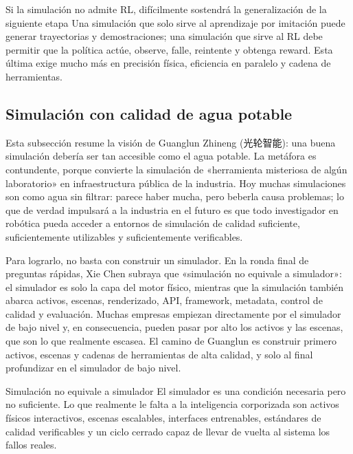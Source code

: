 \documentclass[a4paper]{article}
\begin{document}
\begin{warningbox}{Si la simulación no admite RL, difícilmente sostendrá la generalización de la siguiente etapa}
Una simulación que solo sirve al aprendizaje por imitación puede generar trayectorias y demostraciones; una simulación que sirve al RL debe permitir que la política actúe, observe, falle, reintente y obtenga reward. Esta última exige mucho más en precisión física, eficiencia en paralelo y cadena de herramientas.
\end{warningbox}

\subsection{Simulación con calidad de agua potable}

Esta subsección resume la visión de Guanglun Zhineng (光轮智能): una buena simulación debería ser tan accesible como el agua potable. La metáfora es contundente, porque convierte la simulación de «herramienta misteriosa de algún laboratorio» en infraestructura pública de la industria. Hoy muchas simulaciones son como agua sin filtrar: parece haber mucha, pero beberla causa problemas; lo que de verdad impulsará a la industria en el futuro es que todo investigador en robótica pueda acceder a entornos de simulación de calidad suficiente, suficientemente utilizables y suficientemente verificables.

Para lograrlo, no basta con construir un simulador. En la ronda final de preguntas rápidas, Xie Chen subraya que «simulación no equivale a simulador»: el simulador es solo la capa del motor físico, mientras que la simulación también abarca activos, escenas, renderizado, API, framework, metadata, control de calidad y evaluación. Muchas empresas empiezan directamente por el simulador de bajo nivel y, en consecuencia, pueden pasar por alto los activos y las escenas, que son lo que realmente escasea. El camino de Guanglun es construir primero activos, escenas y cadenas de herramientas de alta calidad, y solo al final profundizar en el simulador de bajo nivel.

\begin{importantbox}{Simulación no equivale a simulador}
El simulador es una condición necesaria pero no suficiente. Lo que realmente le falta a la inteligencia corporizada son activos físicos interactivos, escenas escalables, interfaces entrenables, estándares de calidad verificables y un ciclo cerrado capaz de llevar de vuelta al sistema los fallos reales.
\end{importantbox}
\end{document}
